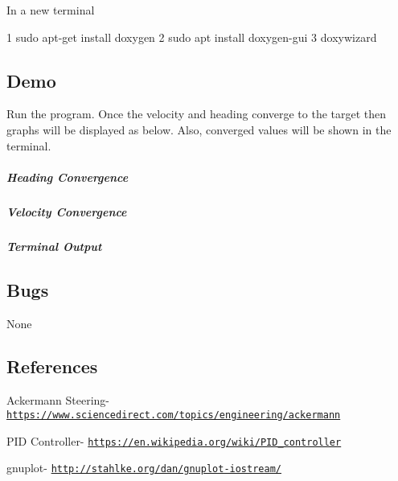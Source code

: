 In a new terminal 
\begin{DoxyCode}
1 sudo apt-get install doxygen
2 sudo apt install doxygen-gui
3 doxywizard
\end{DoxyCode}
 \subsection*{Demo}

Run the program. Once the velocity and heading converge to the target then graphs will be displayed as below. Also, converged values will be shown in the terminal.

\subparagraph*{Heading Convergence}

 

\subparagraph*{Velocity Convergence}

 

\subparagraph*{Terminal Output}

 

\subsection*{Bugs}

None

\subsection*{References}


\begin{DoxyItemize}
\item Ackermann Steering-\/ \href{https://www.sciencedirect.com/topics/engineering/ackermann}{\tt https\+://www.\+sciencedirect.\+com/topics/engineering/ackermann}
\item P\+ID Controller-\/ \href{https://en.wikipedia.org/wiki/PID_controller}{\tt https\+://en.\+wikipedia.\+org/wiki/\+P\+I\+D\+\_\+controller}
\item gnuplot-\/ \href{http://stahlke.org/dan/gnuplot-iostream/}{\tt http\+://stahlke.\+org/dan/gnuplot-\/iostream/} 
\end{DoxyItemize}